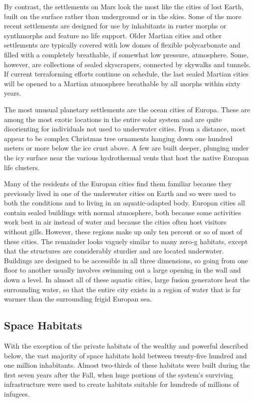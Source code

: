 By contrast, the settlements on Mars look the most 
like the cities of lost Earth, built on the surface rather 
than underground or in the skies. Some of the more 
recent settlements are designed for use by inhabitants 
in ruster morphs or synthmorphs and feature no life 
support. Older Martian cities and other settlements 
are typically covered with low domes of flexible polycarbonate and filled with a completely breathable, if 
somewhat low pressure, atmosphere. Some, however, 
are collections of sealed skyscrapers, connected by 
skywalks and tunnels. If current terraforming efforts 
continue on schedule, the last sealed Martian cities 
will be opened to a Martian atmosphere breathable 
by all morphs within sixty years.

The most unusual planetary settlements are the 
ocean cities of Europa. These are among the most 
exotic locations in the entire solar system and are 
quite disorienting for individuals not used to underwater cities. From a distance, most appear to be 
complex Christmas tree ornaments hanging down one 
hundred meters or more below the ice crust above. A 
few are built deeper, plunging under the icy surface 
near the various hydrothermal vents that host the 
native Europan life clusters.

Many of the residents of the Europan cities find 
them familiar because they previously lived in one of 
the underwater cities on Earth and so were used to 
both the conditions and to living in an aquatic-adapted body. Europan cities all contain sealed buildings 
with normal atmosphere, both because some activities work best in air instead of water and because the 
cities often host visitors without gills. However, these 
regions make up only ten percent or so of most of 
these cities. The remainder looks vaguely similar to 
many zero-g habitats, except that the structures are 
considerably sturdier and are located underwater. 
Buildings are designed to be accessible in all three dimensions, so going from one floor to another usually 
involves swimming out a large opening in the wall 
and down a level. In almost all of these aquatic cities, 
large fusion generators heat the surrounding water, so 
that the entire city exists in a region of water that is 
far warmer than the surrounding frigid Europan sea.

\subsection{Space Habitats}

With the exception of the private habitats of the 
wealthy and powerful described below, the vast majority of space habitats hold between twenty-five hundred and one million inhabitants. Almost two-thirds 
of these habitats were built during the first seven years 
after the Fall, when huge portions of the system's 
surviving infrastructure were used to create habitats 
suitable for hundreds of millions of infugees.

